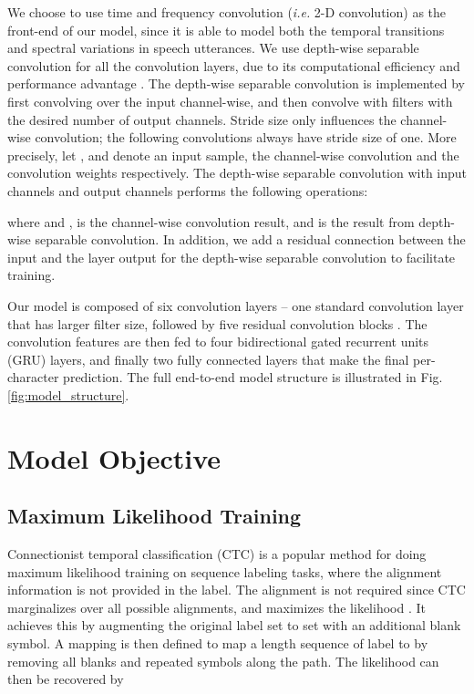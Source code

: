 \documentclass{article}
\newcommand{\ie}{\emph{i.e.}\xspace}
\begin{document}
We choose to use time and frequency convolution (\ie 2-D convolution) as the front-end of our model, since it is able to model both the temporal transitions and spectral variations in speech utterances. We use depth-wise separable convolution \cite{sifre2013rotation, chollet2016xception} for all the convolution layers, due to its computational efficiency and performance advantage \cite{chollet2016xception}. The depth-wise separable convolution is implemented by first convolving over the input channel-wise, and then convolve with  filters with the desired number of output channels. Stride size only influences the channel-wise convolution; the following  convolutions always have stride size of one. More precisely, let ,  and  denote an input sample, the channel-wise convolution and the  convolution weights respectively. The depth-wise separable convolution with  input channels and  output channels performs the following operations:

where  and ,  is the channel-wise convolution result, and  is the result from depth-wise separable convolution.
In addition, we add a residual connection \cite{he2016deep} between the input and the layer output for the depth-wise separable convolution to facilitate training. 


Our model is composed of six convolution layers -- one standard convolution layer that has larger filter size, followed by five residual convolution blocks \cite{he2016deep}.
The convolution features are then fed to four bidirectional gated recurrent units (GRU) \cite{cho2014properties} layers, and finally two fully connected layers that make the final per-character prediction. The full end-to-end model structure is illustrated in Fig. \ref{fig:model_structure}.


\section{Model Objective}
\subsection{Maximum Likelihood Training}
Connectionist temporal classification (CTC) \cite{graves2006ctc}
is a popular method for doing maximum likelihood training on sequence labeling tasks, where the alignment information is not provided in the label. The alignment is not required since CTC marginalizes over all possible alignments, and maximizes the likelihood . It achieves this by augmenting the original label set  to set  with an additional blank symbol. A mapping  is then defined to map a length  sequence of label  to  by removing all blanks and repeated symbols along the path. The likelihood can then be recovered by 
\end{document}
